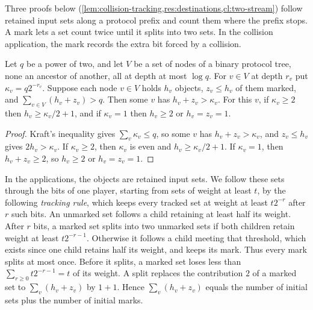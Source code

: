 \documentclass[11pt,letterpaper]{article} \usepackage[utf8]{inputenc}
\theoremstyle{plain} \newtheorem{theorem}{Theorem}[section]
\theoremstyle{definition} \newaliascnt{definition}{theorem}
\begin{document}
Three proofs below (\cref{lem:collision-tracking,res:destinations,cl:two-stream})
follow retained input sets along a protocol prefix and count them where the
prefix stops. A mark lets a set count twice until it splits into two sets. In
the collision application, the mark records the extra bit forced by a collision.

\begin{lemma}\label{lem:kraft-count}
Let $q$ be a power of two, and let $V$ be a set of nodes of a binary protocol
tree, none an ancestor of another, all at depth at most $\log q$. For $v\in V$
at depth $r_v$ put $\kappa_v=q2^{-r_v}$. Suppose each node $v\in V$ holds $h_v$
objects, $z_v\le h_v$ of them marked, and $\sum_{v\in V}(h_v+z_v)>q$. Then some $v$
has $h_v+z_v>\kappa_v$. For this $v$, if $\kappa_v\ge2$ then
$h_v\ge\kappa_v/2+1$, and if $\kappa_v=1$ then $h_v\ge2$ or $h_v=z_v=1$.
\end{lemma}
\begin{proof}
Kraft's inequality gives $\sum_v\kappa_v\le q$, so some $v$ has
$h_v+z_v>\kappa_v$, and $z_v\le h_v$ gives $2h_v>\kappa_v$. If
$\kappa_v\ge2$, then $\kappa_v$ is even and $h_v\ge\kappa_v/2+1$. If
$\kappa_v=1$, then $h_v+z_v\ge2$, so $h_v\ge2$ or $h_v=z_v=1$.
\end{proof}

In the applications, the objects are retained input sets. We follow these sets
through the bits of one player, starting from sets of weight at least
$t$, by the following \emph{tracking rule}, which keeps every tracked set at
weight at least $t2^{-r}$ after $r$ such bits. An unmarked set follows a child retaining at least half its weight.
After $r$ bits, a marked set splits into two unmarked sets if both children retain
weight at least $t2^{-r-1}$. Otherwise it follows a child meeting that threshold,
which exists since one child retains half its weight, and keeps
its mark. Thus every mark splits at most once. Before it splits, a marked
set loses less than $\sum_{r\ge0}t2^{-r-1}=t$ of its weight. A split
replaces the contribution $2$ of a marked set to $\sum_v(h_v+z_v)$ by $1+1$. Hence
$\sum_v(h_v+z_v)$ equals the number of initial sets plus the number of
initial marks.
\end{document}
